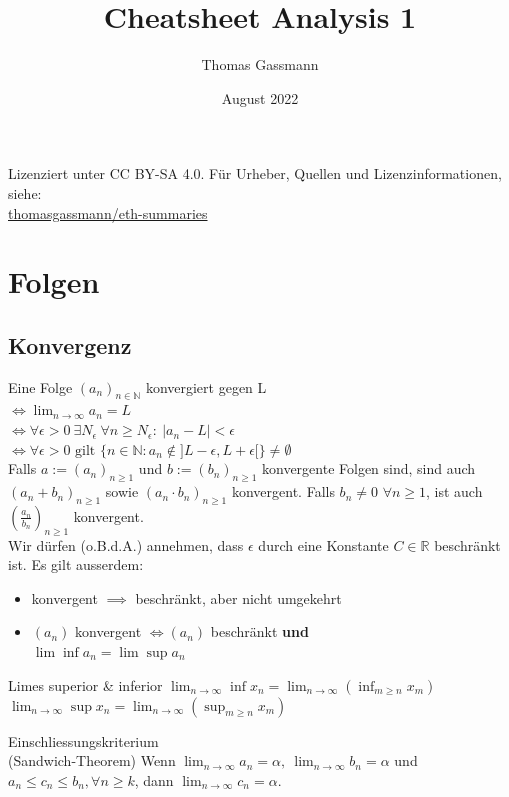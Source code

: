 \documentclass[a4paper,10pt]{article}
\title{Cheatsheet Analysis 1}
\author{Thomas Gassmann}
\date{August 2022}
\def\limn{\lim_{n\to \infty}}
\def\R{\mathbb{R}}
\begin{document}
\begin{center}
  Lizenziert unter CC BY-SA 4.0. Für Urheber, Quellen und Lizenzinformationen, siehe:\\
  \href{https://github.com/thomasgassmann/eth-summaries}{thomasgassmann/eth-summaries}
\end{center}

\section{Folgen}
\subsection{Konvergenz}
Eine Folge $(a_n)_{n\in \mathbb{N}}$ konvergiert gegen L \\
 $\iff \lim_{n \to \infty} a_n = L $ \\ 
 $\iff \forall \epsilon > 0 \ \exists N_\epsilon \ \forall n \ge N_\epsilon : \ | a_n - L | < \epsilon$\\
 $\iff \forall \epsilon > 0\text{ gilt }\{ n\in\mathbb{N}:a_n\notin ]L-\epsilon,L+\epsilon[ \} \neq \emptyset $\\

Falls $a := (a_n)_{n \geq 1}$ und $b := (b_n)_{n \geq 1}$ konvergente Folgen sind, sind auch $(a_n + b_n)_{n \geq 1}$ sowie $(a_n \cdot b_n)_{n \geq 1}$ konvergent. Falls $b_n \neq 0$ $\forall n \geq 1$, ist auch $(\frac{a_n}{b_n})_{n \geq 1}$ konvergent.\\

Wir dürfen (o.B.d.A.) annehmen, dass $\epsilon$ durch eine Konstante $C \in \R$ beschränkt ist.
Es gilt ausserdem:
\begin{itemize}
 \item konvergent $\implies$ beschränkt, aber nicht umgekehrt
 \item $(a_n)$ konvergent $\iff (a_n)$ beschränkt \textbf{und} \\$\lim \inf a_n = \lim \sup a_n$
\end{itemize}


\begin{subbox}{Limes superior \& inferior}
$\limn \inf x_n = \limn \left( \inf_{m \ge n} x_m \right)$ \\
$\limn \sup x_n = \limn \left( \sup_{m \ge n} x_m \right)$
\end{subbox}

\begin{mainbox}{Einschliessungskriterium \\ (Sandwich-Theorem)}
Wenn $\limn a_n = \alpha, \ \limn b_n = \alpha$ und $a_n \le c_n \le b_n, \forall n \ge k$, dann $\limn c_n = \alpha$.
\end{mainbox}
\end{document}
